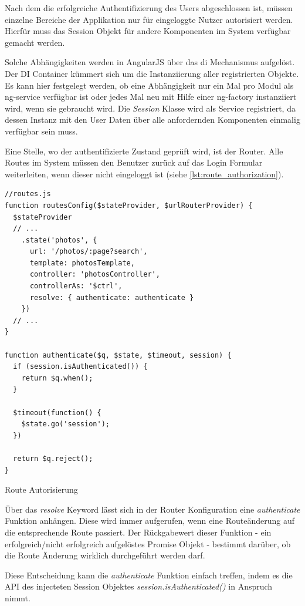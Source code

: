 Nach dem die erfolgreiche Authentifizierung des Users abgeschlossen ist, müssen einzelne Bereiche der Applikation nur für eingeloggte Nutzer autorisiert werden. Hierfür muss das Session Objekt für andere Komponenten im System verfügbar gemacht werden. 

Solche Abhängigkeiten werden in AngularJS über das \gls{di} Mechanismus aufgelöst. Der DI Con­tai­ner kümmert sich um die Instanziierung aller registrierten Objekte. Es kann hier festgelegt werden, ob eine Abhängigkeit nur ein Mal pro Modul als \gls{ng-service} verfügbar ist oder jedes Mal neu mit Hilfe einer \gls{ng-factory} instanziiert wird, wenn sie gebraucht wird. 
Die \textit{Session} Klasse wird als Service registriert, da dessen Instanz mit den User Daten über alle anfordernden Komponenten einmalig verfügbar sein muss. 

Eine Stelle, wo der authentifizierte Zustand geprüft wird, ist der Router. Alle Routes im System müssen den Benutzer zurück auf das Login Formular weiterleiten, wenn dieser nicht eingeloggt ist (siehe \ref{lst:route_authorization}).

\begin{listing}[H]
\begin{verbatim}
//routes.js
function routesConfig($stateProvider, $urlRouterProvider) {
  $stateProvider
  // ...
    .state('photos', {
      url: '/photos/:page?search',
      template: photosTemplate,
      controller: 'photosController',
      controllerAs: '$ctrl',
      resolve: { authenticate: authenticate }
    })
  // ... 
}

function authenticate($q, $state, $timeout, session) {
  if (session.isAuthenticated()) {
    return $q.when();
  }

  $timeout(function() {
    $state.go('session');
  })

  return $q.reject();
}

\end{verbatim}
\caption{Route Autorisierung}
\label{lst:route_authorization}
\end{listing}

Über das \textit{resolve} Keyword lässt sich in der Router Konfiguration eine \textit{authenticate} Funktion anhängen. Diese wird immer aufgerufen, wenn eine Routeänderung auf die entsprechende Route passiert. Der Rückgabewert dieser Funktion - ein erfolgreich/nicht erfolgreich aufgelöstes Promise Objekt - bestimmt darüber, ob die Route Änderung wirklich durchgeführt werden darf.

Diese Entscheidung kann die \textit{authenticate} Funktion einfach treffen, indem es die API des injecteten Session Objektes \textit{session.isAuthenticated()} in Anspruch nimmt.

